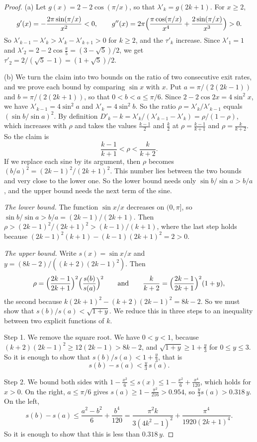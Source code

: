 \begin{proof}
(a) Let $g(x)=2-2\cos(\pi/x)$, so that $\lambda'_k=g(2k+1)$. For $x\ge2$,
\[
 g'(x)=-\frac{2\pi\sin(\pi/x)}{x^2}<0,\qquad
 g''(x)=2\pi\Bigl(\frac{\pi\cos(\pi/x)}{x^4}+\frac{2\sin(\pi/x)}{x^3}\Bigr)>0 .
\]
So $\lambda'_{k-1}-\lambda'_k>\lambda'_k-\lambda'_{k+1}>0$ for $k\ge2$, and
the $\tau'_k$ increase. Since $\lambda'_1=1$ and
$\lambda'_2=2-2\cos\frac\pi5=(3-\sqrt5)/2$, we get
$\tau'_2=2/(\sqrt5-1)=(1+\sqrt5)/2$.

(b) We turn the claim into two bounds on the ratio of two consecutive exit
rates, and we prove each bound by comparing $\sin x$ with $x$. Put
$a=\pi/(2(2k-1))$ and $b=\pi/(2(2k+1))$, so that $0<b<a\le\pi/6$. Since
$2-2\cos2x=4\sin^2x$, we have $\lambda'_{k-1}=4\sin^2a$ and
$\lambda'_k=4\sin^2b$. So the ratio $\rho=\lambda'_k/\lambda'_{k-1}$ equals
$(\sin b/\sin a)^2$. By definition
$D'_k-k=\lambda'_k/(\lambda'_{k-1}-\lambda'_k)=\rho/(1-\rho)$, which increases
with $\rho$ and takes the values $\frac{k-1}2$ and $\frac k2$ at
$\rho=\frac{k-1}{k+1}$ and $\rho=\frac k{k+2}$. So the claim is
\[
 \frac{k-1}{k+1}<\rho<\frac k{k+2}.
\]
If we replace each sine by its argument, then $\rho$ becomes
$(b/a)^2=(2k-1)^2/(2k+1)^2$. This number lies between the two bounds and very
close to the lower one. So the lower bound needs only $\sin b/\sin a>b/a$, and
the upper bound needs the next term of the sine.

\emph{The lower bound.} The function $\sin x/x$ decreases on $(0,\pi]$, so
$\sin b/\sin a>b/a=(2k-1)/(2k+1)$. Then $\rho>(2k-1)^2/(2k+1)^2>(k-1)/(k+1)$,
where the last step holds because $(2k-1)^2(k+1)-(k-1)(2k+1)^2=2>0$.

\emph{The upper bound.} Write $s(x)=\sin x/x$ and
$y=(8k-2)/((k+2)(2k-1)^2)$. Then
\[
 \rho=\Bigl(\frac{2k-1}{2k+1}\Bigr)^2\Bigl(\frac{s(b)}{s(a)}\Bigr)^2
 \qquad\text{and}\qquad
 \frac k{k+2}=\Bigl(\frac{2k-1}{2k+1}\Bigr)^2(1+y),
\]
the second because $k(2k+1)^2-(k+2)(2k-1)^2=8k-2$. So we must show that
$s(b)/s(a)<\sqrt{1+y}$. We reduce this in three steps to an inequality between
two explicit functions of $k$.

Step 1. We remove the square root. We have $0<y<1$, because
$(k+2)(2k-1)^2\ge12(2k-1)>8k-2$, and $\sqrt{1+y}\ge1+\frac y3$ for
$0\le y\le3$. So it is enough to show that $s(b)/s(a)<1+\frac y3$, that is
\[
 s(b)-s(a)<\tfrac y3\,s(a).
\]

Step 2. We bound both sides with
$1-\frac{x^2}6\le s(x)\le1-\frac{x^2}6+\frac{x^4}{120}$, which holds for
$x>0$. On the right, $a\le\pi/6$ gives $s(a)\ge1-\frac{\pi^2}{216}>0.954$, so
$\frac y3s(a)>0.318\,y$. On the left,
\[
 s(b)-s(a)\le\frac{a^2-b^2}6+\frac{b^4}{120}
 =\frac{\pi^2k}{3(4k^2-1)^2}+\frac{\pi^4}{1920(2k+1)^4}.
\]
So it is enough to show that this is less than $0.318\,y$.


\end{proof}
